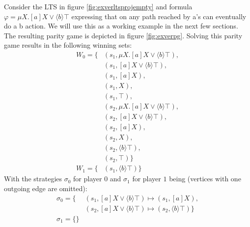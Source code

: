 Consider the LTS in figure \ref{fig:exverltsprojempty} and formula $\varphi = \mu X.[a]X \vee \langle b \rangle \top$ expressing that on any path reached by a's can eventually do a b action. We will use this as a working example in the next few sections. The resulting parity game is depicted in figure \ref{fig:exverpg}. Solving this parity game results in the following winning sets:
\begin{align*}
W_0 = \{& (s_1, \mu X.[a]X \vee \langle b \rangle \top),\\
& (s_1, [a]X \vee \langle b \rangle \top),\\
& (s_1, [a]X),\\
& (s_1, X),\\
& (s_1, \top),\\
& (s_2, \mu X.[a]X \vee \langle b \rangle \top),\\
& (s_2, [a]X \vee \langle b \rangle \top),\\
& (s_2, [a]X),\\
& (s_2, X),\\
& (s_2, \langle b \rangle \top),\\
& (s_2, \top)
 \}\\
W_1 = \{& (s_1, \langle b \rangle \top )\}
\end{align*}
With the strategies $\sigma_0$ for player $0$ and $\sigma_1$ for player $1$ being (vertices with one outgoing edge are omitted):
\begin{align*}
\sigma_0 = \{
&(s_1, [a]X \vee \langle b \rangle \top) \mapsto (s_1, [a] X), \\
&(s_2, [a]X \vee \langle b \rangle \top) \mapsto (s_2, \langle b \rangle \top) \} \\
\sigma_1 = \{\} \\
\end{align*}
